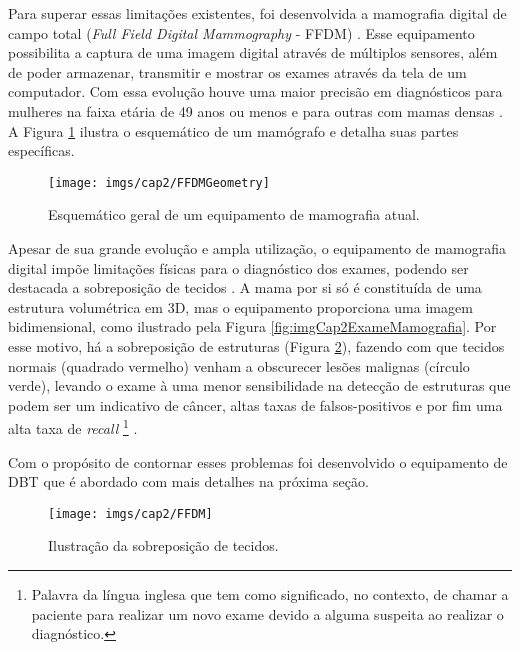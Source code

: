 Para superar essas limitações existentes, foi desenvolvida a mamografia digital de campo total (\textit{Full Field Digital Mammography} - \acs{FFDM})  \cite{nishikawa1987scanned,yaffe1988development}. Esse equipamento possibilita a captura de uma imagem digital através de múltiplos sensores, além de poder armazenar, transmitir e mostrar os exames através da tela de um computador. Com essa evolução houve uma maior precisão em diagnósticos para mulheres na faixa etária de 49 anos ou menos e para outras com mamas densas \cite{vedantham2015digital}. A Figura \ref{fig:imgCap2EsquematicoMamografia} ilustra o esquemático de um mamógrafo e detalha suas partes específicas. 

\begin{figure}[H]
	\caption{Esquemático geral de um equipamento de mamografia atual.}
	\begin{center}
		\texttt{[image: imgs/cap2/FFDMGeometry]}
	\end{center}
	\label{fig:imgCap2EsquematicoMamografia}
\end{figure}

Apesar de sua grande evolução e ampla utilização, o equipamento de mamografia digital impõe limitações físicas para o diagnóstico dos exames, podendo ser destacada a sobreposição de tecidos \cite{vedantham2015digital}. A mama por si só é constituída de uma estrutura volumétrica em \acs{3D}, mas o equipamento proporciona uma imagem bidimensional, como ilustrado pela Figura \ref{fig:imgCap2ExameMamografia}. Por esse motivo, há a sobreposição de estruturas (Figura \ref{fig:imgCap2MamografiaSobreposicao}), fazendo com que tecidos normais (quadrado vermelho) venham a obscurecer lesões malignas (círculo verde), levando o exame à uma menor sensibilidade na detecção de estruturas que podem ser um indicativo de câncer, altas taxas de falsos-positivos e por fim uma alta taxa de \textit{recall} \footnote{Palavra da língua inglesa que tem como significado, no contexto, de chamar a paciente para realizar um novo exame devido a alguma suspeita ao realizar o diagnóstico.} \cite{roth2014digital}. 

Com o propósito de contornar esses problemas foi desenvolvido o equipamento de \acs{DBT} que é abordado com mais detalhes na próxima seção. 

\begin{figure}[H]
	\caption{Ilustração da sobreposição de tecidos.}
	\begin{center}
		\texttt{[image: imgs/cap2/FFDM]}
	\end{center}
	\label{fig:imgCap2MamografiaSobreposicao}
\end{figure}    

